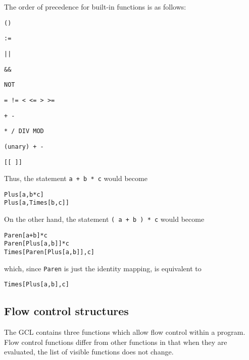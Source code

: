 The order of precedence for built-in functions is as follows:
\bd
\item
\verb+()+
\item
\verb+:=+
\item
\verb+||+
\item
\verb+&&+
\item
\verb+NOT+
\item
\verb+= != < <= > >=+
\item
\verb&+ -&
\item
\verb+* / DIV MOD+
\item
\verb&(unary) + -&
\item
\verb+[[ ]]+
\ed

Thus, the statement \verb&a + b * c& would become 
\begin{verbatim}
Plus[a,b*c]
Plus[a,Times[b,c]]
\end{verbatim}

\noindent
On the other hand, the statement \verb&( a + b ) * c& would become 
\begin{verbatim}
Paren[a+b]*c
Paren[Plus[a,b]]*c
Times[Paren[Plus[a,b]],c]
\end{verbatim}

\noindent
which, since \verb+Paren+ is just the identity mapping, is equivalent to
\begin{verbatim}
Times[Plus[a,b],c]
\end{verbatim}

\medskip

\subsection{Flow control structures}

The GCL contains three functions which allow flow control within a
program.  Flow control functions differ from other functions in that
when they are evaluated, the list of visible functions does not
change.

\medskip

